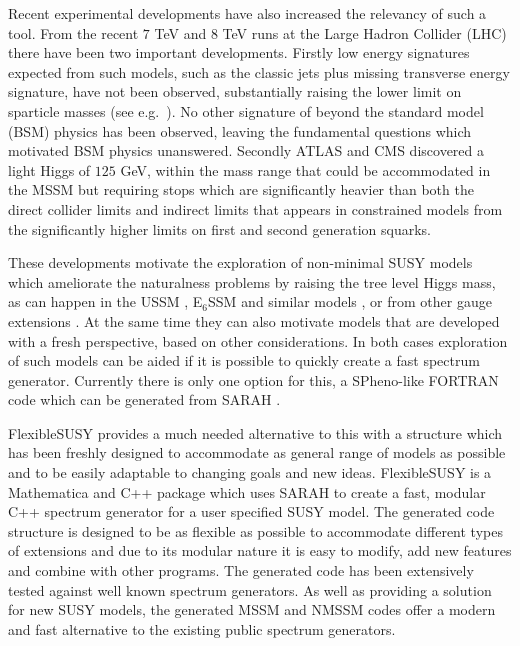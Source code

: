 \documentclass[final,3p,11pt,pdflatex]{elsarticle}
\makeatletter
\newcommand{\sarah}{SARAH\@\xspace}
\newcommand{\fs}{FlexibleSUSY\@\xspace}
\newcommand{\mathematica}{Mathematica\xspace}
\newcommand{\ESSM}{E$_6$SSM\@\xspace}
\makeatother
\begin{document}
Recent experimental developments have also increased the relevancy of
such a tool. From the recent $7$ TeV and $8$ TeV runs at the Large
Hadron Collider (LHC) there have been two important developments.
Firstly low energy signatures expected from such models, such as the
classic jets plus missing transverse energy signature, have not been
observed, substantially raising the lower limit on sparticle masses
(see e.g.~\cite{Aad:2013wta,Chatrchyan:2014lfa}). No other signature
of beyond the standard model (BSM) physics has been observed, leaving
the fundamental questions which motivated BSM physics
unanswered. Secondly ATLAS and CMS discovered \cite{ATLAS:2012ae,
  Chatrchyan:2012tx} a light Higgs of $125$ GeV, within the mass range
that could be accommodated in the MSSM but requiring stops which are
significantly heavier than both the direct collider limits and
indirect limits that appears in constrained models from the
significantly higher limits on first and second generation squarks.

These developments motivate the exploration of non-minimal SUSY models
which ameliorate the naturalness problems by raising the tree level
Higgs mass, as can happen in the USSM
\cite{Fayet:1977yc,Cvetic:1997ky,Langacker:2008yv}, \ESSM
\cite{King:2005jy,Athron:2010zz} and similar models
\cite{Nevzorov:2012hs}, or from other gauge extensions
\cite{Batra:2003nj, Bharucha:2013ela}. At the same time they can also
motivate models that are developed with a fresh perspective, based on
other considerations.  In both cases exploration of such models can be
aided if it is possible to quickly create a fast spectrum generator.
Currently there is only one option for this, a SPheno-like FORTRAN
code which can be generated from \sarah
\cite{Staub:2010ty,Staub:2009bi,Staub:2010jh,Staub:2012pb,Staub:2013tta}.

\fs provides a much needed alternative to this with a structure which
has been freshly designed to accommodate as general range of models as
possible and to be easily adaptable to changing goals and new
ideas. \fs is a \mathematica and C++ package which uses \sarah to create a
fast, modular C++ spectrum generator for a user specified SUSY model.
The generated code structure is designed to be as flexible as possible
to accommodate different types of extensions and due to its modular
nature it is easy to modify, add new features and combine with other
programs.  The generated code has been extensively tested against well
known spectrum generators. As well as providing a solution for new
SUSY models, the generated MSSM and NMSSM codes offer a modern and fast
alternative to the existing public spectrum generators.
\end{document}
